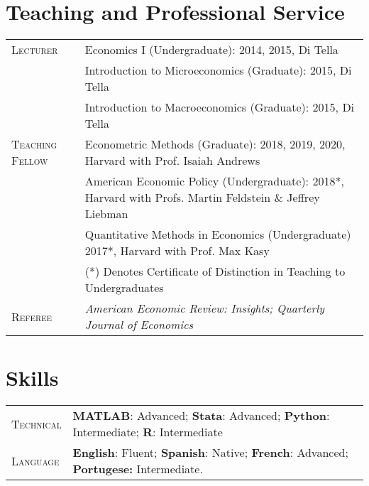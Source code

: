 \documentclass[letterpaper,9pt]{article} %
\begin{document}
\section{Teaching and Professional Service}
\begin{tabular}{>{\raggedleft\arraybackslash}p{}|p{}}
	\textsc{Lecturer} & Economics I (Undergraduate):  \footnotesize{2014, 2015, Di Tella} \\
	& Introduction to Microeconomics (Graduate): \footnotesize{2015, Di Tella} \\
	& Introduction to Macroeconomics (Graduate): \footnotesize{2015, Di Tella} \\	
	\textsc{Teaching Fellow} & Econometric Methods (Graduate): \footnotesize{2018, 2019, 2020, Harvard with Prof. Isaiah Andrews} \\
	& American Economic Policy (Undergraduate): \footnotesize{2018*, Harvard with Profs. Martin Feldstein \& Jeffrey Liebman} \\
	& Quantitative Methods in Economics (Undergraduate) \footnotesize{2017*, Harvard with Prof. Max Kasy} \\
	& \footnotesize{(*) Denotes Certificate of Distinction in Teaching to Undergraduates} \\
	\textsc{Referee} & \emph{American Economic Review: Insights; Quarterly Journal of Economics} \\
	
\end{tabular}
	
\section{Skills}
\begin{tabular}[htb]{>{\raggedleft\arraybackslash}p{}|p{}}
	\textsc{Technical} & \textbf{MATLAB}: Advanced; \textbf{Stata}: Advanced; \textbf{Python}: Intermediate; \textbf{R}: Intermediate \\
	
	\textsc{Language} & \textbf{English}: Fluent; \textbf{Spanish}: Native; \textbf{French}: Advanced; \textbf{Portugese:} Intermediate. \\

\end{tabular}
\end{document}
